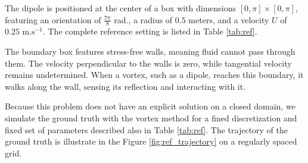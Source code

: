 The dipole is positioned at the center of a box with dimensions $[0, \pi] \times [0, \pi]$, featuring an orientation of $\frac{7\pi}{8}$ rad., a radius of $0.5$ meters, and a velocity $U$ of $0.25 \text{ m.s}^{-1}$. The complete reference setting is listed in Table \ref{tab:ref}.

The boundary box features stress-free walls, meaning fluid cannot pass through them. The velocity perpendicular to the walls is zero, while tangential velocity remains undetermined. When a vortex, such as a dipole, reaches this boundary, it walks along the wall, sensing its reflection and interacting with it.

Because this problem does not have an explicit solution on a closed domain, we simulate the ground truth with the vortex method for a fined discretization and fixed set of parameters described also in Table \ref{tab:ref}. The trajectory of the ground truth is illustrate in the Figure \ref{fig:ref_trajectory} on a regularly spaced grid.


